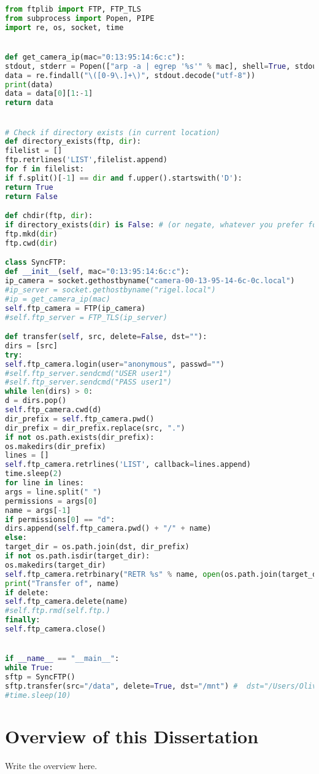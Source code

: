 \documentclass[\home/main.tex]{subfiles}
\begin{document}
    \begin{lstlisting}[caption={Some Python code},label={lst:label},language=Python]
from ftplib import FTP, FTP_TLS
from subprocess import Popen, PIPE
import re, os, socket, time


def get_camera_ip(mac="0:13:95:14:6c:c"):
stdout, stderr = Popen(["arp -a | egrep '%s'" % mac], shell=True, stdout=PIPE).communicate()
data = re.findall("\([0-9\.]+\)", stdout.decode("utf-8"))
print(data)
data = data[0][1:-1]
return data


# Check if directory exists (in current location)
def directory_exists(ftp, dir):
filelist = []
ftp.retrlines('LIST',filelist.append)
for f in filelist:
if f.split()[-1] == dir and f.upper().startswith('D'):
return True
return False

def chdir(ftp, dir):
if directory_exists(dir) is False: # (or negate, whatever you prefer for readability)
ftp.mkd(dir)
ftp.cwd(dir)

class SyncFTP:
def __init__(self, mac="0:13:95:14:6c:c"):
ip_camera = socket.gethostbyname("camera-00-13-95-14-6c-0c.local")
#ip_server = socket.gethostbyname("rigel.local")
#ip = get_camera_ip(mac)
self.ftp_camera = FTP(ip_camera)
#self.ftp_server = FTP_TLS(ip_server)

def transfer(self, src, delete=False, dst=""):
dirs = [src]
try:
self.ftp_camera.login(user="anonymous", passwd="")
#self.ftp_server.sendcmd("USER user1")
#self.ftp_server.sendcmd("PASS user1")
while len(dirs) > 0:
d = dirs.pop()
self.ftp_camera.cwd(d)
dir_prefix = self.ftp_camera.pwd()
dir_prefix = dir_prefix.replace(src, ".")
if not os.path.exists(dir_prefix):
os.makedirs(dir_prefix)
lines = []
self.ftp_camera.retrlines('LIST', callback=lines.append)
time.sleep(2)
for line in lines:
args = line.split(" ")
permissions = args[0]
name = args[-1]
if permissions[0] == "d":
dirs.append(self.ftp_camera.pwd() + "/" + name)
else:
target_dir = os.path.join(dst, dir_prefix)
if not os.path.isdir(target_dir):
os.makedirs(target_dir)
self.ftp_camera.retrbinary("RETR %s" % name, open(os.path.join(target_dir, name), "wb").write)
print("Transfer of", name)
if delete:
self.ftp_camera.delete(name)
#self.ftp.rmd(self.ftp.)
finally:
self.ftp_camera.close()


if __name__ == "__main__":
while True:
sftp = SyncFTP()
sftp.transfer(src="/data", delete=True, dst="/mnt") #  dst="/Users/Olivier/"
#time.sleep(10)
  \end{lstlisting}
   
\section{Overview of this Dissertation}\label{background:overview}

  Write the overview here. \lipsum[1]
  
   
\end{document}
